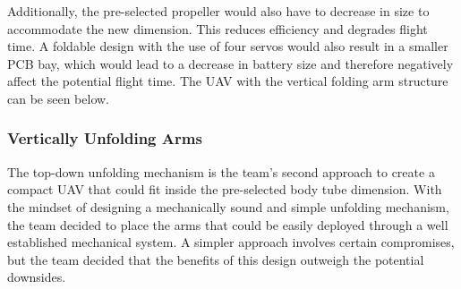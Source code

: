			Additionally, the pre-selected propeller would also have to decrease in size to accommodate the new dimension. This reduces efficiency and degrades flight time. A foldable design with the use of four servos would also result in a smaller PCB bay, which would lead to a decrease in battery size and therefore negatively affect the potential flight time. The UAV with the vertical folding arm structure can be seen below.
		

		\subsubsection{Vertically Unfolding Arms}
			The top-down unfolding mechanism is the team’s second approach to create a compact UAV that could fit inside the pre-selected body tube dimension. With the mindset of designing a mechanically sound and simple unfolding mechanism, the team decided to place the arms that could be easily deployed through a well established mechanical system. A simpler approach involves certain compromises, but the team decided that the benefits of this design outweigh the potential downsides. 

